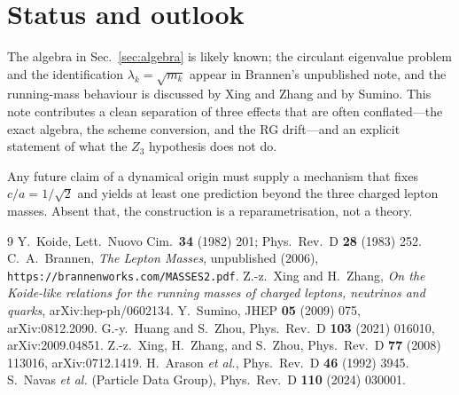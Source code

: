\documentclass[11pt]{article}
\begin{document}
\section{Status and outlook}
\label{sec:outlook}

The algebra in Sec.~\ref{sec:algebra} is likely known; the circulant
eigenvalue problem and the identification $\lambda_k=\sqrt{m_k}$ appear in
Brannen's unpublished note, and the running-mass behaviour is discussed by
Xing and Zhang and by Sumino. This note contributes a clean separation of three
effects that are often conflated---the exact algebra, the scheme conversion,
and the RG drift---and an explicit statement of what the $Z_3$ hypothesis does
not do.

Any future claim of a dynamical origin must supply a mechanism that fixes
$c/a=1/\sqrt2$ and yields at least one prediction beyond the three charged
lepton masses. Absent that, the construction is a reparametrisation, not a
theory.

\begin{thebibliography}{9}
 Y.~Koide, Lett.\ Nuovo Cim.\ \textbf{34} (1982) 201;
Phys.\ Rev.\ D \textbf{28} (1983) 252.
 C.~A.~Brannen, \emph{The Lepton Masses}, unpublished (2006),
\texttt{https://brannenworks.com/MASSES2.pdf}.
 Z.-z.~Xing and H.~Zhang,
\emph{On the Koide-like relations for the running masses of charged leptons,
neutrinos and quarks}, arXiv:hep-ph/0602134.
 Y.~Sumino, JHEP \textbf{05} (2009) 075, arXiv:0812.2090.
 G.-y.~Huang and S.~Zhou, Phys.\ Rev.\ D \textbf{103} (2021)
016010, arXiv:2009.04851.
 Z.-z.~Xing, H.~Zhang, and S.~Zhou,
Phys.\ Rev.\ D \textbf{77} (2008) 113016, arXiv:0712.1419.
 H.~Arason \emph{et al.}, Phys.\ Rev.\ D \textbf{46} (1992) 3945.
 S.~Navas \emph{et al.} (Particle Data Group),
Phys.\ Rev.\ D \textbf{110} (2024) 030001.
\end{thebibliography}
\end{document}
